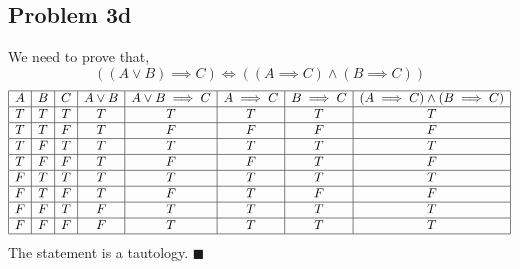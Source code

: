 \documentclass[answers]{exam}
\theoremstyle{mytheoremstyle}
\theoremstyle{mytheoremstyle}
\theoremstyle{myproblemstyle}
\begin{document}
\subsection*{Problem 3d}
\begin{framed}
    We need to prove that,
    \[\left((A\lor B)\implies C\right)\iff \left((A\implies C) \land (B\implies C)\right)\]
    \begin{displaymath}
        \begin{array}{|c|c|c|c|c|c|c|c|}
            \hline
            A & B & C & A\lor B & A\lor B\implies C & A\implies C & B\implies C & (A\implies C) \land (B\implies C) \\\hline
            T & T & T & T       & T                 & T           & T           & T                                 \\\hline
            T & T & F & T       & F                 & F           & F           & F                                 \\\hline
            T & F & T & T       & T                 & T           & T           & T                                 \\\hline
            T & F & F & T       & F                 & F           & T           & F                                 \\\hline
            F & T & T & T       & T                 & T           & T           & T                                 \\\hline
            F & T & F & T       & F                 & T           & F           & F                                 \\\hline
            F & F & T & F       & T                 & T           & T           & T                                 \\\hline
            F & F & F & F       & T                 & T           & T           & T                                 \\\hline
        \end{array}
    \end{displaymath}
    The statement is a tautology. \(\blacksquare\)
\end{framed}
\end{document}

